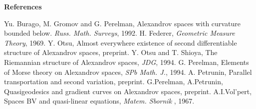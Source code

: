 \bigskip\bigskip
\centerline{\bf References}
\bigskip
\label{[BGP]} Yu. Burago, M. Gromov and G. Perelman, Alexandrov spaces with
  curvature bounded below.  {\it Russ. Math. Surveys}, 1992.
\label{[F]} H. Federer, {\it Geometric Measure Theory}, 1969.
\label{[O]} Y. Otsu, Almost everywhere existence of second differentiable
structure
  of Alexandrov spaces, preprint.
\label{[OS]} Y. Otsu and T. Shioya, The Riemannian structure of Alexandrov
  spaces, {\it JDG}, 1994.
\label{[P]} G. Perelman, Elements of Morse theory on Alexandrov spaces,
  {\it SPb Math. J.}, 1994.
\label{[Pet]} A. Petrunin, Parallel transportation and second variation,
  preprint.
\label{[PPet]} G.Perelman, A.Petrunin, Quasigeodesics and gradient curves
on Alexandrov spaces, preprint. 
\label{[V]} A.I.Vol'pert, Spaces BV and quasi-linear equations, {\it Matem.
Sbornik} , 1967.
\enddocument
